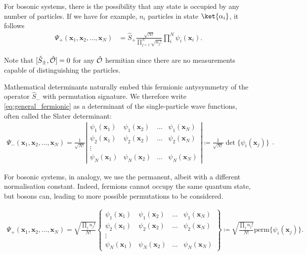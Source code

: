 For bosonic systems, there is the possibility that any state is occupied by any number of particles. If we have for example, $n_i$ particles in state $\ket{\alpha_i}$, it follows
\begin{align}
    \Psi_+(\mathbf{x}_1, \mathbf{x}_2, \ldots, \mathbf{x}_N) &= \hat{S}_{+} \frac{\sqrt{N!}}{\prod_{j=1}^N \sqrt{n_j!}}\prod_i^N \psi_i(\mathbf{x}_i). \label{eq:general_boson}
\end{align}

\begin{JTD}
Note that $[\hat{S}_{\pm}, \hat{\mathcal{O}}] = 0$ for any $\hat{\mathcal{O}}$ hermitian since there are no measurements capable of distinguishing the particles. 
\end{JTD}
 
Mathematical determinants naturally embed this fermionic antysymmetry of the operator $\hat{S}_-$ with permutation signature. We therefore write \eqref{eq:general_fermionic} as a determinant of the single-particle wave functions, often called the Slater determinant:
\begin{equation}
    \begin{split}
\Psi_-(\mathbf{x}_1, \mathbf{x}_2, \ldots, \mathbf{x}_N) 
= \frac{1}{\sqrt{N!}} 
 \left | 
\begin{array}{cccc}
\psi_1(\mathbf{x}_1) & \psi_1(\mathbf{x}_2) & \ldots & \psi_1(\mathbf{x}_N) \\
\psi_2(\mathbf{x}_1) & \psi_2(\mathbf{x}_2) & \ldots & \psi_2(\mathbf{x}_N) \\
 \vdots & & &  \\
\psi_N(\mathbf{x}_1) & \psi_N(\mathbf{x}_2) & \ldots & \psi_N(\mathbf{x}_N) 
\end{array}
\right | \coloneqq  \frac{1}{\sqrt{N!}}  \det\{\psi_i(\mathbf{x}_j)\}
\end{split}.
\end{equation}

For bosonic systems, in analogy, we use the permanent, albeit with a different normalisation constant. Indeed, fermions cannot occupy the same quantum state, but bosons can, leading to more possible permutations to be considered.

\begin{equation}
    \begin{split}
\Psi_+(\mathbf{x}_1, \mathbf{x}_2, \ldots, \mathbf{x}_N) 
= \sqrt{\frac{\prod _j n_j!}{N!}} 
 \left \{ 
\begin{array}{cccc}
\psi_1(\mathbf{x}_1) & \psi_1(\mathbf{x}_2) & \ldots & \psi_1(\mathbf{x}_N) \\
\psi_2(\mathbf{x}_1) & \psi_2(\mathbf{x}_2) & \ldots & \psi_2(\mathbf{x}_N) \\
 \vdots & & &  \\
\psi_N(\mathbf{x}_1) & \psi_N(\mathbf{x}_2) & \ldots & \psi_N(\mathbf{x}_N) 
\end{array}
\right \} \coloneqq  \sqrt{\frac{\prod _j n_j!}{N!}}  \text{perm}\{\psi_i(\mathbf{x}_j)\}.
\end{split}
\end{equation}


